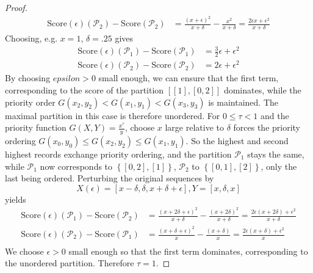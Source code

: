 \documentclass{article}
\theoremstyle{case}
\begin{document}
\begin{proof}
\begin{align*}
\text{Score}\left(\epsilon \right)\left(\mathcal{P}_2 \right) - \text{Score}\left(\mathcal{P}_2 \right) &= \frac{\left( x + \epsilon\right)^2}{x + \delta}  - \frac{x^2}{x+\delta}= \frac{2\epsilon x + \epsilon^2}{x+\delta}
\end{align*}
Choosing, e.g. $x = 1$, $\delta = .25$ gives 
\begin{align*}
\text{Score}\left(\epsilon \right)\left(\mathcal{P}_1 \right) - \text{Score}\left(\mathcal{P}_1 \right) &= \frac{3}{2}\epsilon + \epsilon^2 \\
\text{Score}\left(\epsilon \right)\left(\mathcal{P}_2 \right) - \text{Score}\left(\mathcal{P}_2 \right) &= 2\epsilon + \epsilon^2
\end{align*}
By choosing $epsilon > 0$ small enough, we can ensure that the first term, corresponding to the score of the partition $\left[ \left[ 1\right], \left[ 0, 2\right]\right]$ dominates, while the priority order $G(x_2, y_2) < G(x_1, y_1) < G(x_3, y_3)$ is maintained. The maximal partition in this case is therefore unordered.
For $ 0 \leq \tau < 1$ and the priority function $G(X,Y) = \frac{x^{\tau}}{y}$, choose $x$ large relative to $\delta$ forces the priority ordering $G(x_0, y_0) \leq G(x_2, y_2) \leq G(x_1, y_1)$. So the  highest and second highest records exchange priority ordering, and the partition $\mathcal{P}_1$ stays the same, while $\mathcal{P}_1$ now corresponds to $\left\lbrace \left[ 0, 2\right], \left[ 1\right]\right\rbrace$, $\mathcal{P}_2$ to $\left\lbrace \left[ 0, 1\right], \left[ 2\right]\right\rbrace$, only the last being ordered. Perturbing the original sequences by
\[
X\left(\epsilon\right) = \left[ x-\delta, \delta, x + \delta + \epsilon\right], Y = \left[ x, \delta, x\right]
\]
yields
\begin{align*}
\text{Score}\left(\epsilon \right)\left(\mathcal{P}_1 \right) - \text{Score}\left(\mathcal{P}_2 \right) &= \frac{\left( x + 2\delta + \epsilon\right)^2}{x + \delta}  - \frac{\left( x + 2\delta\right)^2}{x + \delta} = \frac{2\epsilon\left( x + 2\delta\right) + \epsilon^2}{x + \delta} \\
\text{Score}\left(\epsilon \right)\left(\mathcal{P}_2 \right) - \text{Score}\left(\mathcal{P}_1 \right) &= \frac{\left( x + \delta + \epsilon\right)^2}{x} - \frac{\left( x + \delta\right)}{x} = \frac{2\epsilon\left( x + \delta \right) + \epsilon^2}{x} \\
\end{align*}
We choose $\epsilon > 0$ small enough so that the first term dominates, corresponding to the unordered partition. Therefore $\tau = 1$.
\end{proof}
\end{document}
